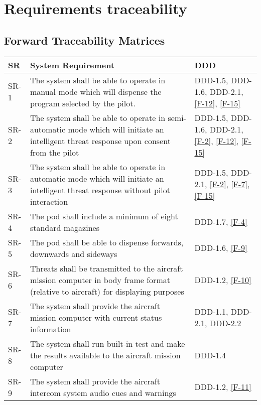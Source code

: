 \documentclass[Main]{subfiles}
\begin{document}
\chapter{Requirements traceability}


\section{Forward Traceability Matrices}


\begin{longtable}{p{} p{} p{}} \hline
SR & System Requirement & DDD \\\hline

SR-1 & The system shall be able to operate in manual mode which will dispense the program selected by the pilot. & DDD-1.5, DDD-1.6, DDD-2.1, \ref{F-12}, \ref{F-15} \\

SR-2 & The system shall be able to operate in semi-automatic mode which will initiate an intelligent threat response upon consent from the pilot & DDD-1.5, DDD-1.6, DDD-2.1, \ref{F-2}, \ref{F-12}, \ref{F-15} \\

SR-3 & The system shall be able to operate in automatic mode which will initiate an intelligent threat response without pilot interaction & DDD-1.5, DDD-2.1, \ref{F-2}, \ref{F-7}, \ref{F-15} \\

SR-4 & The pod shall include a minimum of eight standard magazines & DDD-1.7, \ref{F-4} \\

SR-5 & The pod shall be able to dispense forwards, downwards and sideways & DDD-1.6, \ref{F-9} \\

SR-6 & Threats shall be transmitted to the aircraft mission computer in body frame format (relative to aircraft) for displaying purposes &  DDD-1.2, \ref{F-10}\\

SR-7 & The system shall provide the aircraft mission computer with current status information & DDD-1.1, DDD-2.1, DDD-2.2 \\

SR-8 &  The system shall run built-in test and make the results available to the aircraft mission computer & DDD-1.4 \\

SR-9 & The system shall provide the aircraft intercom system audio cues and warnings & DDD-1.2, \ref{F-11} \\


\end{longtable}
\end{document}
